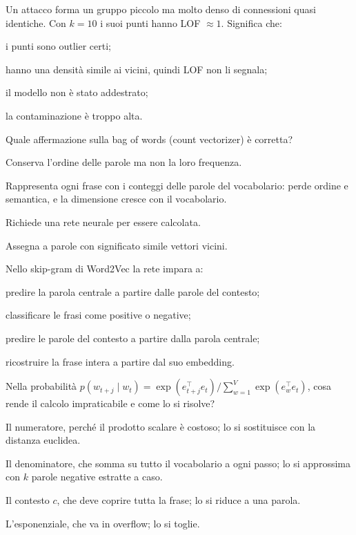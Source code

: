 \begin{domanda}[LOF]\label{quiz:m44}
Un attacco forma un gruppo piccolo ma molto denso di connessioni quasi identiche. Con $k=10$ i suoi punti hanno LOF $\approx 1$. Significa che:
\begin{opzioni}
  \item i punti sono outlier certi;
  \item hanno una densità simile ai vicini, quindi LOF non li segnala;
  \item il modello non è stato addestrato;
  \item la contaminazione è troppo alta.
\end{opzioni}
\end{domanda}


\begin{domanda}\label{quiz:m45}
Quale affermazione sulla bag of words (count vectorizer) è corretta?
\begin{opzioni}
  \item Conserva l'ordine delle parole ma non la loro frequenza.
  \item Rappresenta ogni frase con i conteggi delle parole del vocabolario: perde ordine e semantica, e la dimensione cresce con il vocabolario.
  \item Richiede una rete neurale per essere calcolata.
  \item Assegna a parole con significato simile vettori vicini.
\end{opzioni}
\end{domanda}

\begin{domanda}\label{quiz:m46}
Nello skip-gram di Word2Vec la rete impara a:
\begin{opzioni}
  \item predire la parola centrale a partire dalle parole del contesto;
  \item classificare le frasi come positive o negative;
  \item predire le parole del contesto a partire dalla parola centrale;
  \item ricostruire la frase intera a partire dal suo embedding.
\end{opzioni}
\end{domanda}

\begin{domanda}\label{quiz:m47}
Nella probabilità $p(w_{t+j} \mid w_t) = \exp(e_{t+j}^{\top} e_t) / \sum_{w=1}^{V} \exp(e_w^{\top} e_t)$, cosa rende il calcolo impraticabile e come lo si risolve?
\begin{opzioni}
  \item Il numeratore, perché il prodotto scalare è costoso; lo si sostituisce con la distanza euclidea.
  \item Il denominatore, che somma su tutto il vocabolario a ogni passo; lo si approssima con $k$ parole negative estratte a caso.
  \item Il contesto $c$, che deve coprire tutta la frase; lo si riduce a una parola.
  \item L'esponenziale, che va in overflow; lo si toglie.
\end{opzioni}
\end{domanda}

